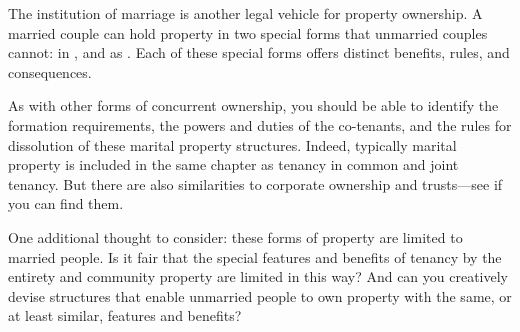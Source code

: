 The institution of marriage is another legal vehicle for property ownership. A
married couple can hold property in two special forms that unmarried couples
cannot: in , and as .
Each of these special forms offers distinct benefits, rules, and consequences.

As with other forms of concurrent ownership, you should be able to identify the
formation requirements, the powers and duties of the co-tenants, and the rules
for dissolution of these marital property structures. Indeed, typically marital
property is included in the same chapter as tenancy in common and joint tenancy.
But there are also similarities to corporate ownership and trusts---see if you
can find them.

One additional thought to consider: these forms of property are limited to
married people. Is it fair that the special features and benefits of tenancy by
the entirety and community property are limited in this way? And can you
creatively devise structures that enable unmarried people to own property with
the same, or at least similar, features and benefits?
